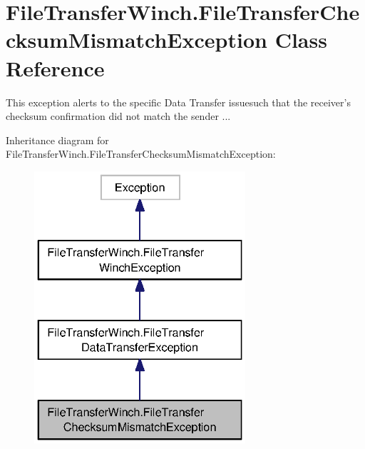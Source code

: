 \section{File\-Transfer\-Winch.\-File\-Transfer\-Checksum\-Mismatch\-Exception Class Reference}
\label{classorg_1_1smallfoot_1_1filexfer_1_1FileTransferWinch_1_1FileTransferChecksumMismatchException}


This exception alerts to the specific Data Transfer issuesuch that the receiver's checksum confirmation did not match the sender ...  




Inheritance diagram for File\-Transfer\-Winch.\-File\-Transfer\-Checksum\-Mismatch\-Exception\-:\nopagebreak
\begin{figure}[H]
\begin{center}
\leavevmode
\includegraphics[width=222pt]{classorg_1_1smallfoot_1_1filexfer_1_1FileTransferWinch_1_1FileTransferChecksumMismatchException__inherit__graph}
\end{center}
\end{figure}


